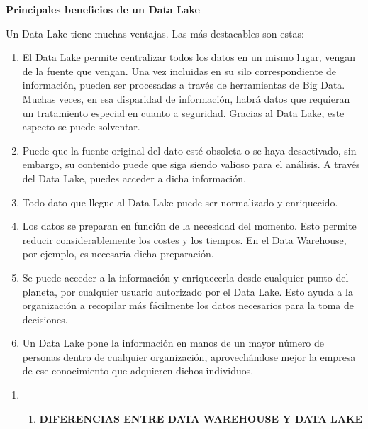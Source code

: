 \documentclass{article} %
\begin{document}
\noindent \textbf{}

\noindent \textbf{Principales beneficios de un Data Lake}

\noindent Un Data Lake tiene muchas ventajas. Las m\'{a}s destacables son estas:

\noindent 

\begin{enumerate}
\item  El Data Lake permite centralizar todos los datos en un mismo lugar, vengan de la fuente que vengan. Una vez incluidas en su silo correspondiente de informaci\'{o}n, pueden ser procesadas a trav\'{e}s de herramientas de Big Data. Muchas veces, en esa disparidad de informaci\'{o}n, habr\'{a} datos que requieran un tratamiento especial en cuanto a seguridad. Gracias al Data Lake, este aspecto se puede solventar.

\item  Puede que la fuente original del dato est\'{e} obsoleta o se haya desactivado, sin embargo, su contenido puede que siga siendo valioso para el an\'{a}lisis. A trav\'{e}s del Data Lake, puedes acceder a dicha informaci\'{o}n.

\item  Todo dato que llegue al Data Lake puede ser normalizado y enriquecido.

\item  Los datos se preparan en funci\'{o}n de la necesidad del momento. Esto permite reducir considerablemente los costes y los tiempos. En el Data Warehouse, por ejemplo, es necesaria dicha preparaci\'{o}n.

\item  Se puede acceder a la informaci\'{o}n y enriquecerla desde cualquier punto del planeta, por cualquier usuario autorizado por el Data Lake. Esto ayuda a la organizaci\'{o}n a recopilar m\'{a}s f\'{a}cilmente los datos necesarios para la toma de decisiones.

\item  Un Data Lake pone la informaci\'{o}n en manos de un mayor n\'{u}mero de personas dentro de cualquier organizaci\'{o}n, aprovech\'{a}ndose mejor la empresa de ese conocimiento que adquieren dichos individuos.
\end{enumerate}

\noindent 

\begin{enumerate}
\item \begin{enumerate}
\item  \textbf{DIFERENCIAS ENTRE DATA WAREHOUSE Y DATA LAKE}
\end{enumerate}
\end{enumerate}
\end{document}

